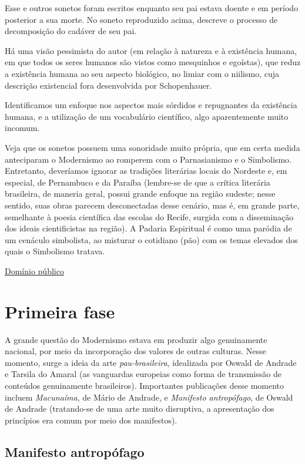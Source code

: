 Esse e outros sonetos foram escritos enquanto seu pai estava doente e em período posterior a sua morte. No soneto reproduzido acima, descreve o processo de decomposição do cadáver de seu pai.

Há uma visão pessimista do autor (em relação à natureza e à existência humana, em que todos os seres humanos são vistos como mesquinhos e egoístas), que reduz a existência humana ao seu aspecto biológico, no limiar com o niilismo, cuja descrição existencial fora desenvolvida por Schopenhauer.

Identificamos um enfoque nos aspectos mais sórdidos e repugnantes da existência humana, e a utilização de um vocabulário científico, algo aparentemente muito incomum.

Veja que os sonetos possuem uma sonoridade muito própria, que em certa medida anteciparam o Modernismo ao romperem com o Parnasianismo e o Simbolismo. Entretanto, deveríamos ignorar as tradições literárias locais do Nordeste e, em especial, de Pernambuco e da Paraíba (lembre-se de que a crítica literária brasileira, de maneria geral, possui grande enfoque na região sudeste; nesse sentido, suas obras parecem desconectadas desse cenário, mas é, em grande parte, semelhante à poesia científica das escolas do Recife, surgida com a disseminação dos ideais cientificistas na região). A Padaria Espiritual é como uma paródia de um cenáculo simbolista, ao misturar o cotidiano (pão) com os temas elevados dos quais o Simbolismo tratava.

\href{http://www.dominiopublico.gov.br/download/texto/bv.00054a.pdf}{Domínio público}

\section{Primeira fase}

A grande questão do Modernismo estava em produzir algo genuinamente nacional, por meio da incorporação dos valores de outras culturas. Nesse momento, surge a ideia da arte \textit{pau-brasileira}, idealizada por Oswald de Andrade e Tarsila do Amaral (as vanguardas europeias como forma de transmissão de conteúdos genuinamente brasileiros). Importantes publicações desse momento incluem \textit{Macunaíma}, de Mário de Andrade, e \textit{Manifesto antropófago}, de Oswald de Andrade (tratando-se de uma arte muito disruptiva, a apresentação dos princípios era comum por meio dos manifestos).

\subsection{Manifesto antropófago}

